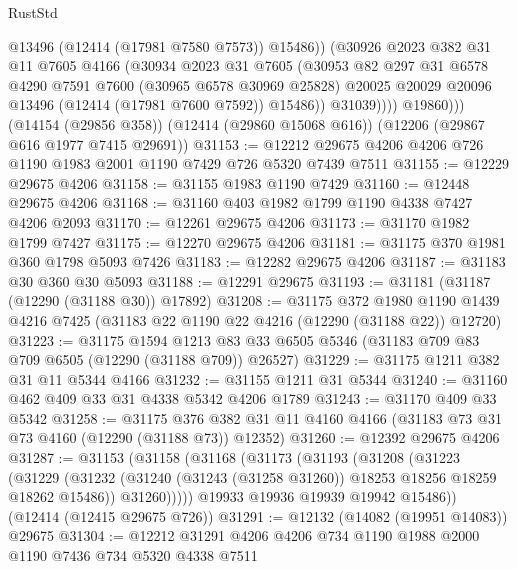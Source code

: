 \begin{lexlean}{RustStd}
\begin{coremodule}
{\begin{coremodule}
{{{{{{{{{{{{{{{{{{{{{{{{{{{{{{{{{{{{{{{{{{{{{{{{{{                    @13496
                    (@12414 (@17981 @7580 @7573))
                    @15486))
                (@30926
                  @2023
                  @382
                  @31
                  @11
                  @7605
                  @4166
                  (@30934
                    @2023
                    @31
                    @7605
                    (@30953
                      @82
                      @297
                      @31
                      @6578
                      @4290
                      @7591
                      @7600
                      (@30965 @6578 @30969 @25828)
                      @20025
                      @20029
                      @20096
                      @13496
                      (@12414 (@17981 @7600 @7592))
                      @15486))
                  @31039))))
          @19860)))
    (@14154 (@29856 @358))
    (@12414 (@29860 @15068 @616))
    (@12206 (@29867 @616 @1977 @7415 @29691))
@31153 := @12212 @29675 @4206 @4206 @726 @1190 @1983 @2001 @1190 @7429 @726 @5320 @7439 @7511
@31155 := @12229 @29675 @4206
@31158 := @31155 @1983 @1190 @7429
@31160 := @12448 @29675 @4206
@31168 := @31160 @403 @1982 @1799 @1190 @4338 @7427 @4206 @2093
@31170 := @12261 @29675 @4206
@31173 := @31170 @1982 @1799 @7427
@31175 := @12270 @29675 @4206
@31181 := @31175 @370 @1981 @360 @1798 @5093 @7426
@31183 := @12282 @29675 @4206
@31187 := @31183 @30 @360 @30 @5093
@31188 := @12291 @29675
@31193 := @31181 (@31187 (@12290 (@31188 @30)) @17892)
@31208 := @31175
    @372
    @1980
    @1190
    @1439
    @4216
    @7425
    (@31183 @22 @1190 @22 @4216 (@12290 (@31188 @22)) @12720)
@31223 := @31175
    @1594
    @1213
    @83
    @33
    @6505
    @5346
    (@31183 @709 @83 @709 @6505 (@12290 (@31188 @709)) @26527)
@31229 := @31175 @1211 @382 @31 @11 @5344 @4166
@31232 := @31155 @1211 @31 @5344
@31240 := @31160 @462 @409 @33 @31 @4338 @5342 @4206 @1789
@31243 := @31170 @409 @33 @5342
@31258 := @31175
    @376
    @382
    @31
    @11
    @4160
    @4166
    (@31183 @73 @31 @73 @4160 (@12290 (@31188 @73)) @12352)
@31260 := @12392 @29675 @4206
@31287 := @31153
    (@31158
      (@31168
        (@31173
          (@31193
            (@31208
              (@31223
                (@31229
                  (@31232 (@31240 (@31243 (@31258 @31260)) @18253 @18256 @18259 @18262 @15486))
                  @31260)))))
        @19933
        @19936
        @19939
        @19942
        @15486))
    (@12414 (@12415 @29675 @726))
@31291 := @12132 (@14082 (@19951 @14083)) @29675
@31304 := @12212 @31291 @4206 @4206 @734 @1190 @1988 @2000 @1190 @7436 @734 @5320 @4338 @7511
}}}}}}}}}}}}}}}}}}}}}}}}}}}}}}}}}}}}}}}}}}}}}}}}}}
\end{coremodule}}
\end{coremodule}
\end{lexlean}
